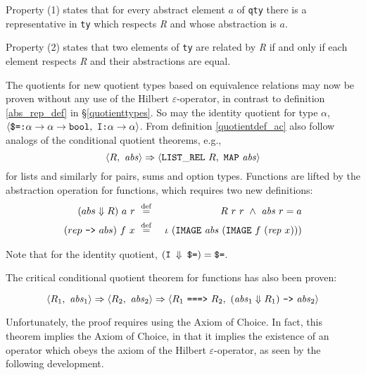 \documentclass[envcountsame,runningheads]{llncs}
\def\defeq{\stackrel{\mathrm{def}}{=}}
\begin{document}
Property (1) states that for every abstract element $a$ of {\tt qty}
there is a representative in {\tt ty} which respects {\it R\/} and whose abstraction is $a$.

Property (2) states that two elements of {\tt ty} are related by {\it R\/}
if and only if
each element respects {\it R} and their abstractions are equal.

The
quotients for new quotient types
based on equivalence relations may now be
proven without any use of the Hilbert $\varepsilon$-operator,
in contrast to definition \ref{abs_rep_def} in \S \ref{quotienttypes}.
So may the identity quotient for type $\alpha$,
$\langle \mbox{\tt \$=:}\alpha \rightarrow \alpha \rightarrow {\tt bool},\ 
\mbox{\tt I:}\alpha \rightarrow \alpha \rangle$.
From
definition \ref{quotientdef_ac}
also follow analogs of the conditional quotient theorems,
e.g.,
$$\langle R,\ {\it abs} \rangle \Rightarrow
\langle {\tt LIST\_REL}\ R,\ {\tt MAP}\ {\it abs} \rangle$$
\noindent
for lists
and similarly for pairs, sums and option types. 
Functions are lifted by
the abstraction operation for functions, which requires two new definitions:
\begin{eqnarray*}
(abs \Downarrow R)\ a\ r \ & \defeq & \ 
R\ r\ r\ \wedge \ {\it abs}\ r = a
\\
(rep \ \mbox{\tt -->} \ abs)\ f\ x \ & \defeq & \ 
\iota \ ({\tt IMAGE}\ {\it abs}\ ({\tt IMAGE}\ f\ ({\it rep}\ x)))
\end{eqnarray*}

\noindent
Note that for the identity quotient,
$(\mbox{\tt I $\Downarrow$ \$=}) = \mbox{\tt \$=}$.

The critical conditional quotient
theorem for functions has also been proven:
\begin{theorem}[Function Conditional Quotient]
\label{functionquotient}
$$
  \langle R_1,\ {\it abs}_1 \rangle \Rightarrow
  \langle R_2,\ {\it abs}_2 \rangle \Rightarrow
\langle R_1 \ \mbox{\tt ===>} \ R_2,\ 
  ({\it abs}_1 \Downarrow R_1) \ \mbox{\tt -->} \ {\it abs}_2 \rangle$$
\end{theorem}
\noindent
Unfortunately, the proof requires using the Axiom of Choice. 
In fact, this theorem implies the Axiom of Choice, in that it implies
the existence of an operator which obeys the axiom of the
Hilbert $\varepsilon$-operator, as seen by the following development.
\end{document}
